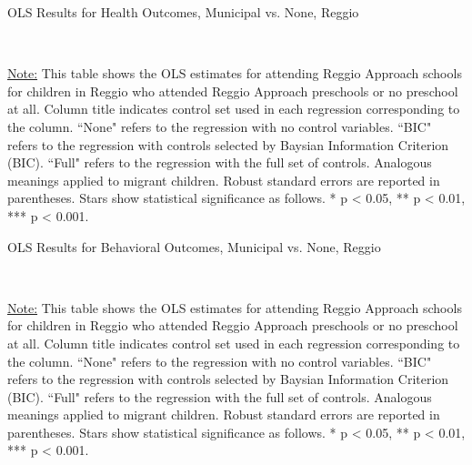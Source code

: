 \begin{table}[H] \caption{OLS Results for Health Outcomes, Municipal vs. None, Reggio} \label{ols-H-child-reg}

\vspace{1ex} \\
\footnotesize\raggedright{\underline{Note:} This table shows the OLS estimates for attending Reggio Approach schools for children in Reggio who attended Reggio Approach preschools or no preschool at all. Column title indicates control set used in each regression corresponding to the column. ``None" refers to the regression with no control variables. ``BIC" refers to the regression with controls selected by Baysian Information Criterion (BIC). ``Full" refers to the regression with the full set of controls. Analogous meanings applied to migrant children. Robust standard errors are reported in parentheses. Stars show statistical significance as follows. * p < 0.05, ** p < 0.01, *** p < 0.001.}
\end{table}

\begin{table}[H] \caption{OLS Results for Behavioral Outcomes, Municipal vs. None, Reggio} \label{ols-B-child-reg}

\vspace{1ex} \\
\footnotesize\raggedright{\underline{Note:} This table shows the OLS estimates for attending Reggio Approach schools for children in Reggio who attended Reggio Approach preschools or no preschool at all. Column title indicates control set used in each regression corresponding to the column. ``None" refers to the regression with no control variables. ``BIC" refers to the regression with controls selected by Baysian Information Criterion (BIC). ``Full" refers to the regression with the full set of controls. Analogous meanings applied to migrant children. Robust standard errors are reported in parentheses. Stars show statistical significance as follows. * p < 0.05, ** p < 0.01, *** p < 0.001.}
\end{table}





